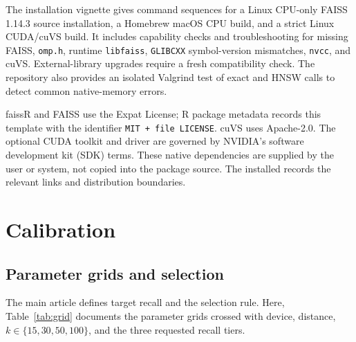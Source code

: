 \documentclass[11pt]{article}
\newcommand{\code}[1]{\texttt{#1}}
\newcommand{\pkg}[1]{\textsf{#1}}
\begin{document}
The installation vignette gives command sequences for a Linux CPU-only
FAISS 1.14.3 source installation, a Homebrew macOS CPU build, and a strict
Linux CUDA/cuVS build. It includes capability checks and troubleshooting for
missing FAISS, \code{omp.h}, runtime \code{libfaiss},
\code{GLIBCXX} symbol-version mismatches, \code{nvcc}, and cuVS.
External-library upgrades require a fresh compatibility check. The repository
also provides an isolated Valgrind test of exact and HNSW calls to detect
common native-memory errors.

\pkg{faissR} and FAISS use the Expat License; R package metadata records this
template with the identifier \code{MIT + file LICENSE}. cuVS uses Apache-2.0.
The optional CUDA toolkit and driver are governed by NVIDIA's software development kit
(SDK) terms. These native dependencies are supplied by the user or system,
not copied into the package source. The installed
 records the relevant links and distribution
boundaries.

\section{Calibration}

\subsection{Parameter grids and selection}

The main article defines target recall and the selection rule. Here,
Table~\ref{tab:grid} documents the parameter grids crossed with device,
distance, $k\in\{15,30,50,100\}$, and the three requested recall tiers.
\end{document}
